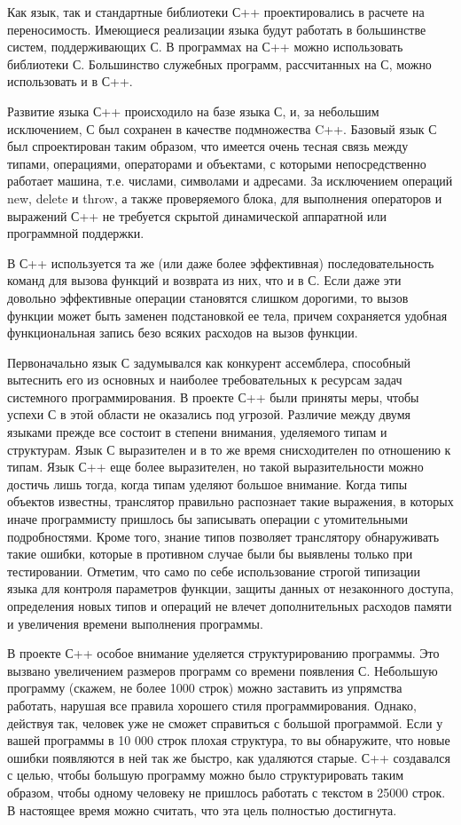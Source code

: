 Как язык, так и стандартные библиотеки С++ проектировались в расчете на переносимость. Имеющиеся реализации языка будут работать в большинстве систем, поддерживающих С. В программах на С++ можно использовать библиотеки С. Большинство служебных программ, рассчитанных на С, можно использовать и в С++.

Развитие языка С++ происходило на базе языка С, и, за небольшим исключением, С был сохранен в качестве подмножества C++. Базовый язык С был спроектирован таким образом, что имеется очень тесная связь между типами, операциями, операторами и объектами, с которыми непосредственно работает машина, т.е. числами, символами и адресами. За исключением операций new, delete и throw, а также проверяемого блока, для выполнения операторов и выражений С++ не требуется скрытой динамической аппаратной или программной поддержки.

В С++ используется та же (или даже более эффективная) последовательность команд для вызова функций и возврата из них, что и в С. Если даже эти довольно эффективные операции становятся слишком дорогими, то вызов функции может быть заменен подстановкой ее тела, причем сохраняется удобная функциональная запись безо всяких расходов на вызов функции.

Первоначально язык С задумывался как конкурент ассемблера, способный вытеснить его из основных и наиболее требовательных к ресурсам задач системного программирования. В проекте С++ были приняты меры, чтобы успехи С в этой области не оказались под угрозой. Различие между двумя языками прежде все состоит в степени внимания, уделяемого типам и структурам. Язык С выразителен и в то же время снисходителен по отношению к типам. Язык С++ еще более выразителен, но такой выразительности можно достичь лишь тогда, когда типам уделяют большое внимание. Когда типы объектов известны, транслятор правильно распознает такие выражения, в которых иначе программисту пришлось бы записывать операции с утомительными подробностями. Кроме того, знание типов позволяет транслятору обнаруживать такие ошибки, которые в противном случае были бы выявлены только при тестировании. Отметим, что само по себе использование строгой типизации языка для контроля параметров функции, защиты данных от незаконного доступа, определения новых типов и операций не влечет дополнительных расходов памяти и увеличения времени выполнения программы.

В проекте С++ особое внимание уделяется структурированию программы. Это вызвано увеличением размеров программ со времени появления С. Небольшую программу (скажем, не более 1000 строк) можно заставить из упрямства работать, нарушая все правила хорошего стиля программирования. Однако, действуя так, человек уже не сможет справиться с большой программой. Если у вашей программы в 10 000 строк плохая структура, то вы обнаружите, что новые ошибки появляются в ней так же быстро, как удаляются старые. С++ создавался с целью, чтобы большую программу можно было
структурировать таким образом, чтобы одному человеку не пришлось работать с текстом в 25000 строк. В настоящее время можно считать, что эта цель полностью достигнута.

